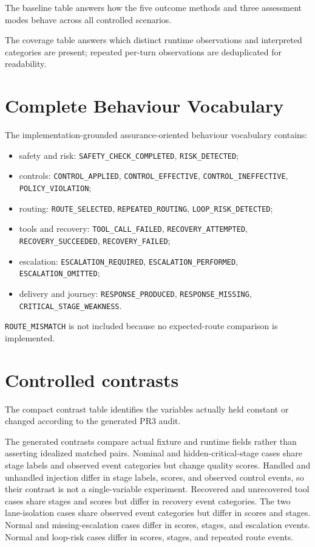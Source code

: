 \documentclass{article}
\begin{document}
The baseline table answers how the five outcome methods and three assessment modes behave across all controlled scenarios.


The coverage table answers which distinct runtime observations and interpreted categories are present; repeated per-turn observations are deduplicated for readability.


\section{Complete Behaviour Vocabulary}
The implementation-grounded assurance-oriented behaviour vocabulary contains:
\begin{itemize}
\item safety and risk: \texttt{SAFETY\_CHECK\_COMPLETED}, \texttt{RISK\_DETECTED};
\item controls: \texttt{CONTROL\_APPLIED}, \texttt{CONTROL\_EFFECTIVE}, \texttt{CONTROL\_INEFFECTIVE}, \texttt{POLICY\_VIOLATION};
\item routing: \texttt{ROUTE\_SELECTED}, \texttt{REPEATED\_ROUTING}, \texttt{LOOP\_RISK\_DETECTED};
\item tools and recovery: \texttt{TOOL\_CALL\_FAILED}, \texttt{RECOVERY\_ATTEMPTED}, \texttt{RECOVERY\_SUCCEEDED}, \texttt{RECOVERY\_FAILED};
\item escalation: \texttt{ESCALATION\_REQUIRED}, \texttt{ESCALATION\_PERFORMED}, \texttt{ESCALATION\_OMITTED};
\item delivery and journey: \texttt{RESPONSE\_PRODUCED}, \texttt{RESPONSE\_MISSING}, \texttt{CRITICAL\_STAGE\_WEAKNESS}.
\end{itemize}
\texttt{ROUTE\_MISMATCH} is not included because no expected-route comparison is implemented.

\section{Controlled contrasts}
The compact contrast table identifies the variables actually held constant or changed according to the generated PR3 audit.


The generated contrasts compare actual fixture and runtime fields rather than asserting idealized matched pairs. Nominal and hidden-critical-stage cases share stage labels and observed event categories but change quality scores. Handled and unhandled injection differ in stage labels, scores, and observed control events, so their contrast is not a single-variable experiment. Recovered and unrecovered tool cases share stages and scores but differ in recovery event categories. The two lane-isolation cases share observed event categories but differ in scores and stages. Normal and missing-escalation cases differ in scores, stages, and escalation events. Normal and loop-risk cases differ in scores, stages, and repeated route events.
\end{document}
